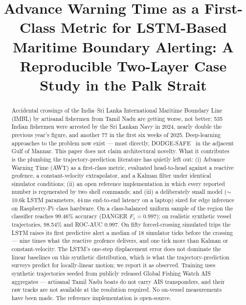 \documentclass[conference]{IEEEtran}
\begin{document}
\title{Advance Warning Time as a First-Class Metric for LSTM-Based Maritime Boundary Alerting: A Reproducible Two-Layer Case Study in the Palk Strait}

\author{
}

\maketitle

\begin{abstract}
Accidental crossings of the India--Sri Lanka International Maritime Boundary Line (IMBL) by artisanal fishermen from Tamil Nadu are getting worse, not better: 535 Indian fishermen were arrested by the Sri Lankan Navy in 2024, nearly double the previous year's figure, and another 77 in the first six weeks of 2025. Deep-learning approaches to the problem now exist --- most directly, DODGE-SAFE~\cite{dodgesafe2025} in the adjacent Gulf of Mannar. This paper does not claim architectural novelty. What it contributes is the plumbing the trajectory-prediction literature has quietly left out: (i) Advance Warning Time (AWT) as a first-class metric, evaluated head-to-head against a reactive geofence, a constant-velocity extrapolator, and a Kalman filter under identical simulator conditions; (ii) an open reference implementation in which every reported number is regenerated by two shell commands; and (iii) a deliberately small model ($\sim$10.6k LSTM parameters, 44\,ms end-to-end latency on a laptop) sized for edge inference on Raspberry-Pi--class hardware. On a class-balanced uniform sample of the region the classifier reaches 99.46\% accuracy (DANGER $F_1 = 0.997$); on realistic synthetic vessel trajectories, 98.54\% and ROC-AUC 0.997. On fifty forced-crossing simulated trips the LSTM raises its first predictive alert a median of 18 simulator ticks before the crossing --- nine times what the reactive geofence delivers, and one tick more than Kalman or constant-velocity. The LSTM's one-step displacement error does not dominate the linear baselines on this synthetic distribution, which is what the trajectory-prediction surveys predict for locally-linear motion; we report it as observed. Training uses synthetic trajectories seeded from publicly released Global Fishing Watch AIS aggregates --- artisanal Tamil Nadu boats do not carry AIS transponders, and their raw tracks are not available at the resolution required. No on-vessel measurements have been made. The reference implementation is open-source.
\end{abstract}
\end{document}
